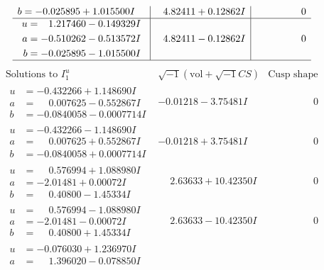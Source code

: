 \documentclass[1p]{elsarticle_modified}
\theoremstyle{definition}
\newcommand{\I}{\sqrt{-1}}
\begin{document}
$$\begin{array}{c|c|c}
\begin{aligned}
b &= -0.025895 + 1.015500 I\end{aligned}
 & \phantom{-}4.82411 + 0.12862 I & \phantom{-0.000000 } 0 \\ \hline\begin{aligned}
u &= \phantom{-}1.217460 - 0.149329 I \\
a &= -0.510262 - 0.513572 I \\
b &= -0.025895 - 1.015500 I\end{aligned}
 & \phantom{-}4.82411 - 0.12862 I & \phantom{-0.000000 } 0\\
 \hline 
 \end{array}$$\newpage$$\begin{array}{c|c|c}  
\text{Solutions to }I^u_{1}& \I (\text{vol} + \sqrt{-1}CS) & \text{Cusp shape}\\
 \hline 
\begin{aligned}
u &= -0.432266 + 1.148690 I \\
a &= \phantom{-}0.007625 - 0.552867 I \\
b &= -0.0840058 - 0.0007714 I\end{aligned}
 & -0.01218 - 3.75481 I & \phantom{-0.000000 } 0 \\ \hline\begin{aligned}
u &= -0.432266 - 1.148690 I \\
a &= \phantom{-}0.007625 + 0.552867 I \\
b &= -0.0840058 + 0.0007714 I\end{aligned}
 & -0.01218 + 3.75481 I & \phantom{-0.000000 } 0 \\ \hline\begin{aligned}
u &= \phantom{-}0.576994 + 1.088980 I \\
a &= -2.01481 + 0.00072 I \\
b &= \phantom{-}0.40800 - 1.45334 I\end{aligned}
 & \phantom{-}2.63633 + 10.42350 I & \phantom{-0.000000 } 0 \\ \hline\begin{aligned}
u &= \phantom{-}0.576994 - 1.088980 I \\
a &= -2.01481 - 0.00072 I \\
b &= \phantom{-}0.40800 + 1.45334 I\end{aligned}
 & \phantom{-}2.63633 - 10.42350 I & \phantom{-0.000000 } 0 \\ \hline\begin{aligned}
u &= -0.076030 + 1.236970 I \\
a &= \phantom{-}1.396020 - 0.078850 I \\

\end{aligned}
\end{array}$$
\end{document}
